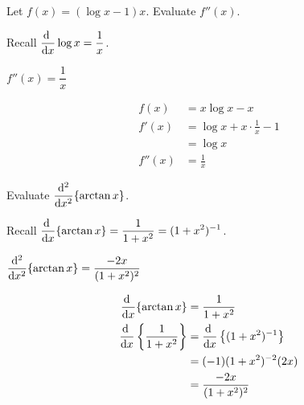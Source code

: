 \subsection*{\Procedural}



\begin{question}
Let $f(x)=(\log x-1)x$. Evaluate $f''(x)$.
\end{question}
\begin{hint}
Recall $\ds\diff{}{x}\log x =\ds\frac{1}{x}$.
\end{hint}
\begin{answer}
$f''(x)=\dfrac{1}{x}$
\end{answer}
\begin{solution}
\begin{align*}
f(x)&=x\log x -x\\
f'(x)&=\log x +x\cdot\frac{1}{x}-1\\
&=\log x\\
f''(x)&=\frac{1}{x}
\end{align*}
\end{solution}






\begin{Mquestion}
Evaluate $\displaystyle\frac{\mathrm{d}^2}{\mathrm{d}{x}^2}\{\arctan x\}$.
\end{Mquestion}
\begin{hint}
Recall $\ds\diff{}{x}\{\arctan x\}=\dfrac{1}{1+x^2}=(1+x^2)^{-1}$.
\end{hint}
\begin{answer}
$\displaystyle\frac{\mathrm{d}^2}{\mathrm{d}{x}^2}\{\arctan x\}=\frac{-2x}{(1+x^2)^2}$
\end{answer}
\begin{solution}
\begin{align*}
\diff{}{x}\{\arctan x\}&=\frac{1}{1+x^2}\\
\diff{}{x}\left\{\frac{1}{1+x^2}\right\}&=\diff{}{x}\left\{(1+x^2)^{-1}\right\}\\
&=(-1)(1+x^2)^{-2}(2x)\\&=\frac{-2x}{(1+x^2)^2}
\end{align*}
\end{solution}


